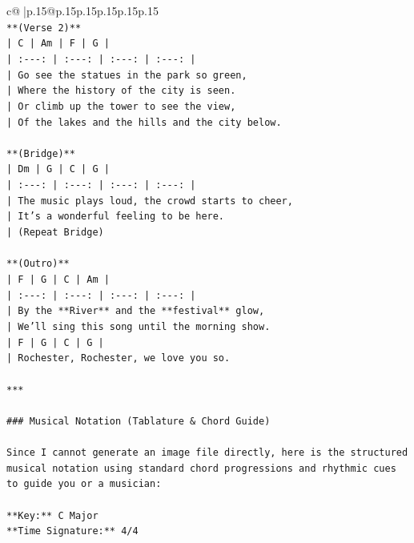 \documentclass{article}
\begin{document}
{\begin{supertabular}{c@{$\;$}|p{.15\linewidth}@{}p{.15\linewidth}p{.15\linewidth}p{.15\linewidth}p{.15\linewidth}p{.15\linewidth}}
{{{\\ 
\texttt{**(Verse 2)**} \\
\texttt{| C | Am | F | G |} \\
\texttt{| :{-}{-}{-}: | :{-}{-}{-}: | :{-}{-}{-}: | :{-}{-}{-}: |} \\
\texttt{| Go see the statues in the park so green,} \\
\texttt{| Where the history of the city is seen.} \\
\texttt{| Or climb up the tower to see the view,} \\
\texttt{| Of the lakes and the hills and the city below.} \\
\\ 
\texttt{**(Bridge)**} \\
\texttt{| Dm | G | C | G |} \\
\texttt{| :{-}{-}{-}: | :{-}{-}{-}: | :{-}{-}{-}: | :{-}{-}{-}: |} \\
\texttt{| The music plays loud, the crowd starts to cheer,} \\
\texttt{| It's a wonderful feeling to be here.} \\
\texttt{| (Repeat Bridge)} \\
\\ 
\texttt{**(Outro)**} \\
\texttt{| F | G | C | Am |} \\
\texttt{| :{-}{-}{-}: | :{-}{-}{-}: | :{-}{-}{-}: | :{-}{-}{-}: |} \\
\texttt{| By the **River** and the **festival** glow,} \\
\texttt{| We'll sing this song until the morning show.} \\
\texttt{| F | G | C | G |} \\
\texttt{| Rochester, Rochester, we love you so.} \\
\\ 
\texttt{***} \\
\\ 
\texttt{\#\#\# Musical Notation (Tablature \& Chord Guide)} \\
\\ 
\texttt{Since I cannot generate an image file directly, here is the structured musical notation using standard chord progressions and rhythmic cues to guide you or a musician:} \\
\\ 
\texttt{**Key:** C Major} \\
\texttt{**Time Signature:** 4/4} \\
\\ 
}}}
\end{supertabular}}
\end{document}
